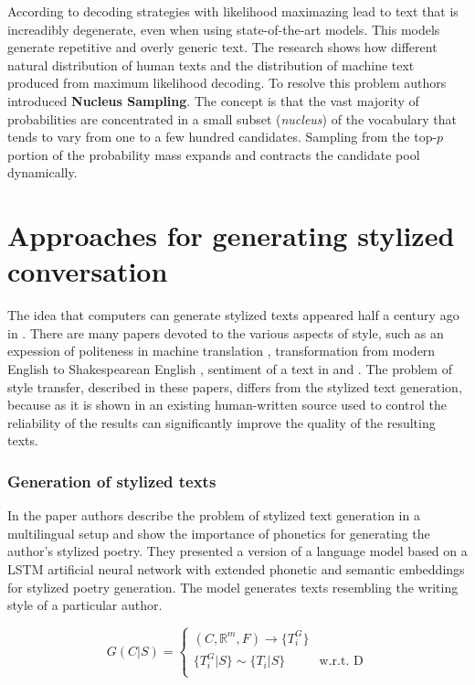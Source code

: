 According to \cite{holtzman2019curious} decoding strategies with likelihood maximazing lead to text that is increadibly degenerate, even when using state-of-the-art models. This models generate repetitive and overly generic text. The research shows how different natural distribution of human texts and the distribution of machine text produced from maximum likelihood decoding. To resolve this problem authors introduced \textbf{Nucleus Sampling}. The concept is that the vast majority of probabilities are concentrated in a small subset (\textit{nucleus}) of the vocabulary that tends to vary from one to a few hundred candidates. Sampling from the top-$p$ portion of the probability mass expands and contracts the candidate pool dynamically.

\section{Approaches for generating stylized conversation} \label{stylized_problems}
The idea that computers can generate stylized texts appeared half a century ago in \cite{wheatley1965computer}. There are many papers devoted to the various aspects of style, such as an expession of politeness in machine translation \cite{sennrich2016controlling}, transformation from modern English to Shakespearean English \cite{jhamtani2017shakespearizing}, sentiment of a text in \cite{shen2017style} and \cite{li2018delete}. The problem of style transfer, described in these papers, differs from the stylized text generation, because as it is shown in \cite{guu2018generating} an existing human-written source used to control the reliability of the results can significantly improve the quality of the resulting texts.

\subsubsection{Generation of stylized texts}

In the paper \cite{tikhonov2018guess} authors describe the problem of stylized text generation in a multilingual setup and show the importance of phonetics for generating the author's stylized poetry. They presented a version of a language model based on a LSTM artificial neural network with extended phonetic and semantic embeddings for stylized poetry generation. The model generates texts resembling the writing style of a particular author.

\begin{equation} \label{eq:poetry_nlg}
G(C|S) = \begin{cases} 
          (C, \mathbb{R}^m, F) \rightarrow \{T_i^G\} \\
          \{T_i^G|S\}  \mathtt{\sim}  \{T_i|S\} & \mbox{w.r.t. D}\\
         \end{cases}
\end{equation}

